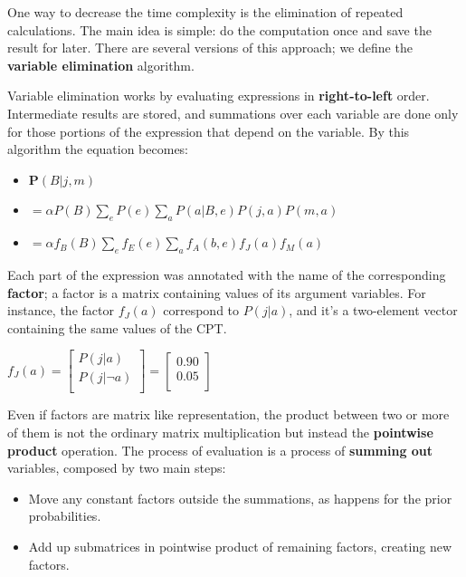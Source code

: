 One way to decrease the time complexity is the elimination of repeated calculations. The main idea is simple: do the computation once and save the result for later.
There are several versions of this approach; we define the \textbf{variable elimination} algorithm. \vspace{3.5pt}

Variable elimination works by evaluating expressions in \textbf{right-to-left} order. Intermediate results are stored, and summations over each variable are done only for 
those portions of the expression that depend on the variable. By this algorithm the equation becomes:
\begin{itemize}
    \renewcommand{\labelitemi}{}
    \item $\mathbf{P}(B|j, m)$
    \item $= \alpha P(B) \sum_{e} P(e) \sum_{a} P(a|B, e) P(j, a) P(m, a)$
    \item $= \alpha f_B(B) \sum_{e} f_E(e) \sum_{a} f_A(b, e) f_J(a) f_M(a)$
\end{itemize}
Each part of the expression was annotated with the name of the corresponding \textbf{factor}; a factor is a matrix containing values of its argument variables.
For instance, the factor $f_J(a)$ correspond to $P(j|a)$, and it's a two-element vector containing the same values of the CPT.
\begin{center}
    $f_J(a) = 
        \begin{bmatrix}
            P(j|a) \\ 
            P(j|\neg a) \\ 
        \end{bmatrix}
    = 
        \begin{bmatrix}
            0.90 \\ 
            0.05 \\ 
        \end{bmatrix}
    $
\end{center}
Even if factors are matrix like representation, the product between two or more of them is not the ordinary matrix multiplication but instead the \textbf{pointwise product} operation.
The process of evaluation is a process of \textbf{summing out} variables, composed by two main steps:
\begin{itemize}
    \renewcommand{\labelitemi}{-}
    \item Move any constant factors outside the summations, as happens for the prior probabilities.
    \item Add up submatrices in pointwise product of remaining factors, creating new factors.
\end{itemize}
